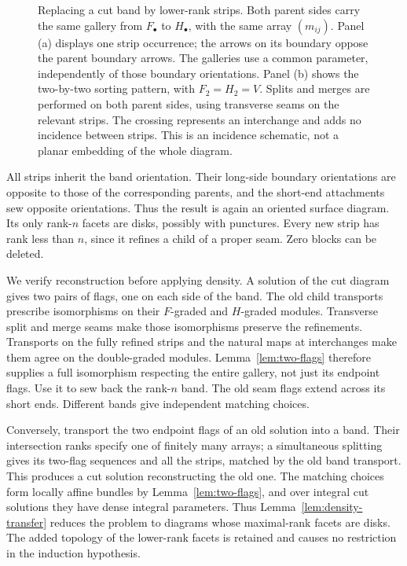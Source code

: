 \begin{figure}[ht]
\centering

\caption{Replacing a cut band by lower-rank strips.
Both parent sides carry the same gallery from $F_\bullet$ to
$H_\bullet$, with the same array $(m_{ij})$.
Panel (a) displays one strip occurrence; the arrows on its boundary
oppose the parent boundary arrows.  The galleries use a common
parameter, independently of those boundary orientations.
Panel (b) shows the two-by-two sorting pattern, with $F_2=H_2=V$.
Splits and merges
are performed on both parent sides, using transverse seams on the
relevant strips.  The crossing represents an interchange and adds
no incidence between strips.  This is an incidence schematic,
not a planar embedding of the whole diagram.}
\label{fig:band-gallery}
\end{figure}

All strips inherit the band orientation.  Their long-side boundary
orientations are opposite to those of the corresponding parents,
and the short-end attachments sew opposite orientations.  Thus the
result is again an oriented surface diagram.  Its only rank-$n$
facets are disks, possibly with punctures.  Every new strip has rank
less than $n$, since it refines a child of a proper seam.  Zero
blocks can be deleted.

We verify reconstruction before applying density.  A solution of
the cut diagram gives two pairs of flags, one on each side of the
band.  The old child transports prescribe isomorphisms on their
$F$-graded and $H$-graded modules.  Transverse split and merge seams
make those isomorphisms preserve the refinements.  Transports on the
fully refined strips and the natural maps at interchanges make
them agree on the double-graded modules.  Lemma~\ref{lem:two-flags}
therefore supplies a full isomorphism respecting the entire gallery,
not just its endpoint flags.  Use it to sew back
the rank-$n$ band.  The old seam flags extend across its short ends.
Different bands give independent matching choices.

Conversely, transport the two endpoint flags of an old solution
into a band.  Their intersection ranks specify one of finitely many
arrays; a simultaneous splitting gives its two-flag sequences and
all the strips, matched by the old band transport.  This produces
a cut solution reconstructing the old one.  The matching choices
form locally affine bundles by Lemma~\ref{lem:two-flags}, and over
integral cut solutions they have dense integral parameters.  Thus
Lemma~\ref{lem:density-transfer} reduces the problem to diagrams
whose maximal-rank facets are disks.  The added topology of the
lower-rank facets is retained and causes no restriction in the
induction hypothesis.

